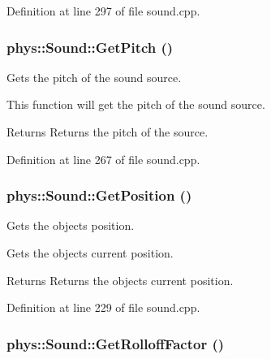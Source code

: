 Definition at line 297 of file sound.cpp.

\hypertarget{classphys_1_1Sound_ae28ce63dc22eb8a80edf9dbfe8ea64cd}{
\subsubsection[{GetPitch}]{ phys::Sound::GetPitch ()}}
\label{dc/d2f/classphys_1_1Sound_ae28ce63dc22eb8a80edf9dbfe8ea64cd}


Gets the pitch of the sound source. 

This function will get the pitch of the sound source. \begin{DoxyReturn}{Returns}
Returns the pitch of the source. 
\end{DoxyReturn}


Definition at line 267 of file sound.cpp.

\hypertarget{classphys_1_1Sound_a6d7097965cb87491896f688a8ef12d45}{
\subsubsection[{GetPosition}]{ phys::Sound::GetPosition ()}}
\label{dc/d2f/classphys_1_1Sound_a6d7097965cb87491896f688a8ef12d45}


Gets the objects position. 

Gets the objects current position. \begin{DoxyReturn}{Returns}
Returns the objects current position. 
\end{DoxyReturn}


Definition at line 229 of file sound.cpp.

\hypertarget{classphys_1_1Sound_ab87182be43ed55e44acf7143a7b08213}{
\subsubsection[{GetRolloffFactor}]{ phys::Sound::GetRolloffFactor ()}}
\label{dc/d2f/classphys_1_1Sound_ab87182be43ed55e44acf7143a7b08213}


